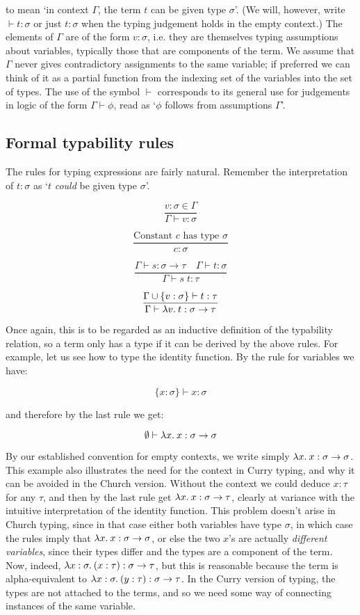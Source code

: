 \noindent to mean `in context $\Gamma$, the term $t$ can be given type
$\sigma$'. (We will, however, write $\vdash t : \sigma$ or just $t : \sigma$
when the typing judgement holds in the empty context.) The elements of $\Gamma$
are of the form $v:\sigma$, i.e. they are themselves typing assumptions about
variables, typically those that are components of the term. We assume that
$\Gamma$ never gives contradictory assignments to the same variable; if
preferred we can think of it as a partial function from the indexing set of the
variables into the set of types. The use of the symbol $\vdash$ corresponds to
its general use for judgements in logic of the form $\Gamma \vdash \phi$, read
as `$\phi$ follows from assumptions $\Gamma$'.

\subsection{Formal typability rules}

The rules for typing expressions are fairly natural. Remember the
interpretation of $t : \sigma$ as `$t$ {\em could} be given type $\sigma$'.

$$ \frac{v:\sigma \in \Gamma}{\Gamma \vdash v : \sigma} $$

$$ \frac{\mbox{Constant $c$ has type $\sigma$}}{c:\sigma} $$

$$ \frac{\Gamma \vdash s : \sigma \to \tau \;\;\;\ \Gamma \vdash t : \sigma}
        {\Gamma \vdash s\; t : \tau} $$

$$ \frac{\Gamma \cup \{v:\sigma\} \vdash t:\tau}
        {\Gamma \vdash \lambda v.\: t : \sigma \to \tau} $$

Once again, this is to be regarded as an inductive definition of the
typability relation, so a term only has a type if it can be derived by the
above rules. For example, let us see how to type the identity function. By the
rule for variables we have:

$$ \{x:\sigma\} \vdash x:\sigma $$

\noindent and therefore by the last rule we get:

$$ \emptyset \vdash \lambda x.\: x : \sigma \to \sigma $$

By our established convention for empty contexts, we write simply $\lambda x.\: x :
\sigma \to \sigma$. This example also illustrates the need for the context in
Curry typing, and why it can be avoided in the Church version. Without the
context we could deduce $x:\tau$ for any $\tau$, and then by the last rule get
$\lambda x.\: x : \sigma \to \tau$, clearly at variance with the intuitive
interpretation of the identity function. This problem doesn't arise in Church
typing, since in that case either both variables have type $\sigma$, in which
case the rules imply that $\lambda x.\: x : \sigma \to \sigma$, or else the two
$x$'s are actually {\em different variables}, since their types differ and the
types are a component of the term. Now, indeed, $\lambda x:\sigma.\: (x:\tau) :
\sigma \to \tau$, but this is reasonable because the term is alpha-equivalent
to $\lambda x:\sigma.\: (y:\tau): \sigma \to \tau$. In the Curry version of typing,
the types are not attached to the terms, and so we need some way of connecting
instances of the same variable.

